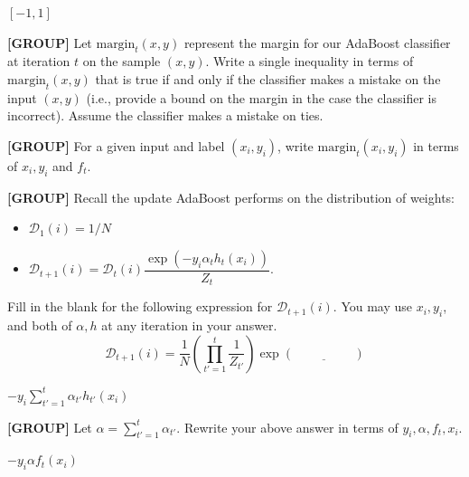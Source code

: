 \documentclass[11pt,addpoints,answers]{exam}
\newcommand{\group}{\textbf{[GROUP]} }
\newcommand{\D}{\mathcal{D}}
\newcommand{\margin}{\text{margin}}
\begin{document}
\begin{questions}
\begin{parts}
\begin{subparts}
\begin{your_solution}[height=3cm, width=6cm]
$[-1, 1]$
\end{your_solution}


\clearpage

\subpart[1] \group Let $\margin_t (x, y)$ represent the margin for our AdaBoost classifier at iteration $t$ on the sample $(x, y)$. Write a single inequality in terms of $\margin_t (x, y)$ that is true if and only if the classifier makes a mistake on the input $(x, y)$ (i.e., provide a bound on the margin in the case the classifier is incorrect). Assume the classifier makes a mistake on ties.


\begin{your_solution}[height=3cm, width=6cm]
\end{your_solution}



\subpart[1] \group For a given input and label $(x_i, y_i)$, write $\margin_t (x_i, y_i)$ in terms of $x_i, y_i$ and $f_t$.

\begin{your_solution}[height=3cm, width=6cm]
\end{your_solution}

\subpart[1] \group Recall the update AdaBoost performs on the distribution of weights:
\begin{itemize}
    \item $\D_1 (i) = 1 / N$
    \item $\D_{t+1} (i) = \D_t (i) \dfrac{\exp(-y_i \alpha_t h_t (x_i))}{Z_t}$.
\end{itemize}
Fill in the blank for the following expression for $\D_{t+1} (i)$. You may use $x_i, y_i$, and both of $\alpha, h$ at any iteration in your answer.
$$ \D_{t+1} (i) = \dfrac{1}{N} \left( \prod_{t'=1}^t \dfrac{1}{Z_{t'}} \right) \exp ( \underline{\hspace{2cm}} )$$

\begin{your_solution}[height=3cm, width=6cm]
$-y_i \sum \limits_{t' =  1}^t \alpha_{t'}h_{t'}(x_i)$
\end{your_solution}

\clearpage

\subpart[1] \group Let $\alpha = \sum_{t'=1}^t \alpha_{t'}$. Rewrite your above answer in terms of $y_i, \alpha, f_t, x_i$.

\begin{your_solution}[height=3cm, width=6cm]
$-y_i \alpha f_{t}(x_i)$
\end{your_solution}




\end{subparts}
\end{parts}
\end{questions}
\end{document}
